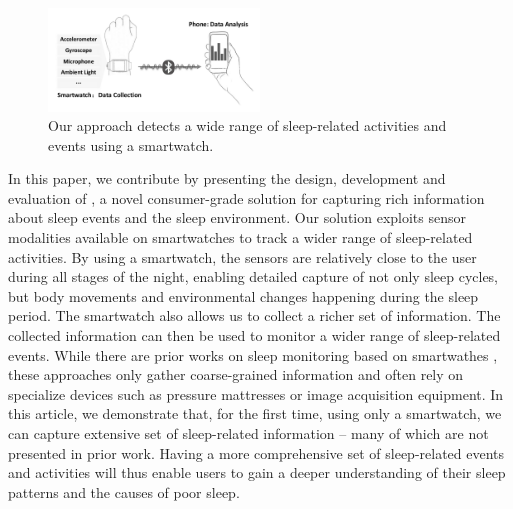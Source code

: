 \begin{figure}[!t]
\centering
\setlength{\belowcaptionskip}{-13pt}
      \includegraphics[width=0.5\textwidth]{Figures/datacollect.pdf}
  \caption{Our approach detects a wide range of sleep-related activities and events using a smartwatch.}\label{fig:datacollect}
\end{figure}


In this paper, we contribute by presenting the design, development and evaluation of \systemname, a novel consumer-grade solution for capturing rich information 
about sleep events and the sleep environment. Our solution exploits sensor modalities available on smartwatches to track a wider range of sleep-related activities. By using a smartwatch, 
the sensors are relatively close to the user during all stages of the night, enabling detailed capture of not only sleep cycles, but body movements and environmental changes happening during the sleep period. 
The smartwatch also allows us to collect a richer set of information. The collected information can then be used to monitor a wider range of sleep-related events. While there are prior works on sleep monitoring
based on smartwathes \cite{pombo2016ubisleep,shelgikar2016sleep,haescher2015anomaly,borazio2012combining}, these approaches only gather
coarse-grained information and often rely on specialize devices such as pressure mattresses or image acquisition equipment. In this
article, we demonstrate that, for the first time, using only a smartwatch, we can capture extensive set of sleep-related information -- many of
which are not presented in prior work. Having a more comprehensive set of sleep-related events and activities will thus enable users to
gain a deeper understanding of their sleep patterns and the causes of poor sleep.



